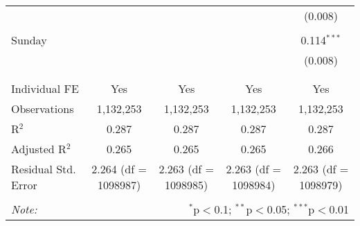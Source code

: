 \documentclass[
]{article}
\begin{document}
\begin{table}[!htbp]
{\begin{tabular}{@{\extracolsep{5pt}}lcccc}
  &  &  &  & (0.008) \\ 
  & & & & \\ 
 Sunday &  &  &  & 0.114$^{***}$ \\ 
  &  &  &  & (0.008) \\ 
  & & & & \\ 
\hline \\[-1.8ex] 
Individual FE & Yes & Yes & Yes & Yes \\ 
Observations & 1,132,253 & 1,132,253 & 1,132,253 & 1,132,253 \\ 
R$^{2}$ & 0.287 & 0.287 & 0.287 & 0.287 \\ 
Adjusted R$^{2}$ & 0.265 & 0.265 & 0.265 & 0.266 \\ 
Residual Std. Error & 2.264 (df = 1098987) & 2.263 (df = 1098985) & 2.263 (df = 1098984) & 2.263 (df = 1098979) \\ 
\hline 
\hline \\[-1.8ex] 
\textit{Note:}  & \multicolumn{4}{r}{$^{*}$p$<$0.1; $^{**}$p$<$0.05; $^{***}$p$<$0.01} \\ 
\end{tabular}
} 
\end{table} 
\newpage
\end{document}
